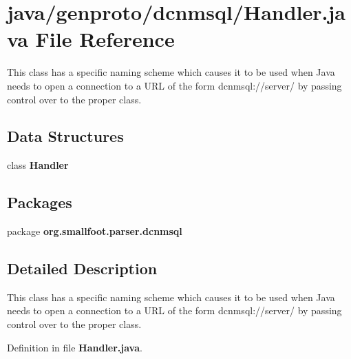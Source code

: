\section{java/genproto/dcnmsql/\+Handler.java File Reference}
\label{genproto_2dcnmsql_2Handler_8java}


This class has a specific naming scheme which causes it to be used when Java needs to open a connection to a U\+R\+L of the form dcnmsql\+://server/ by passing control over to the proper class.  


\subsection*{Data Structures}
\begin{DoxyCompactItemize}
\item 
class {\bf Handler}
\end{DoxyCompactItemize}
\subsection*{Packages}
\begin{DoxyCompactItemize}
\item 
package {\bf org.\+smallfoot.\+parser.\+dcnmsql}
\end{DoxyCompactItemize}


\subsection{Detailed Description}
This class has a specific naming scheme which causes it to be used when Java needs to open a connection to a U\+R\+L of the form dcnmsql\+://server/ by passing control over to the proper class. 



Definition in file {\bf Handler.\+java}.

